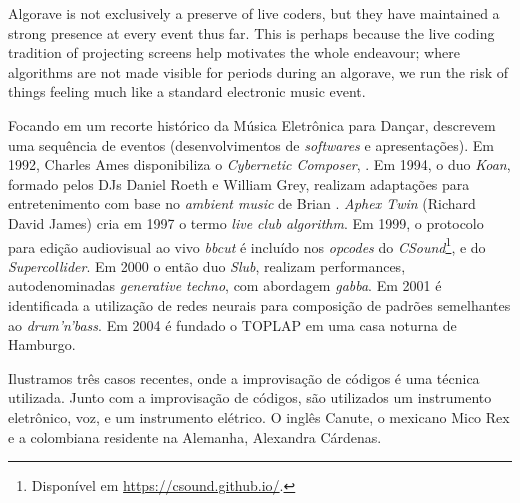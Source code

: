 \begin{citacao}
{Algorave is not exclusively a preserve of live coders, but they have maintained a strong presence at every event thus far. This is perhaps because the live coding tradition of projecting screens help motivates the whole endeavour; where algorithms are not made visible for periods during an algorave, we run the risk of things feeling much like a standard electronic music event.}

\end{citacao}

Focando em um recorte histórico da Música Eletrônica para Dançar,  descrevem uma sequência de eventos (desenvolvimentos de \emph{softwares} e apresentações). Em 1992, Charles Ames disponibiliza o \emph{Cybernetic Composer}, . Em 1994, o duo \emph{Koan}, formado pelos DJs Daniel Roeth e William Grey, realizam adaptações para entretenimento com base no \emph{ambient music} de Brian . \emph{Aphex Twin} (Richard David James) cria em 1997 o termo \emph{live club algorithm}. Em 1999, o protocolo para edição audiovisual ao vivo \emph{bbcut} \cite{collins_bbcut_2003} é incluído nos \emph{opcodes} do \emph{CSound}\footnote{Disponível em \url{https://csound.github.io/}.}, e do \emph{Supercollider}. Em 2000 o então duo \emph{Slub}, realizam performances, autodenominadas \emph{generative techno}, com abordagem \emph{gabba}. Em 2001 é identificada a utilização de redes neurais para composição de padrões semelhantes ao \emph{drum'n'bass}. Em 2004 é fundado o TOPLAP em uma casa noturna de Hamburgo.

Ilustramos três casos recentes, onde a improvisação de códigos é uma técnica utilizada. Junto com a improvisação de códigos, são utilizados um instrumento eletrônico, voz, e um instrumento elétrico. O inglês Canute, o mexicano Mico Rex e a colombiana residente na Alemanha, Alexandra Cárdenas.

